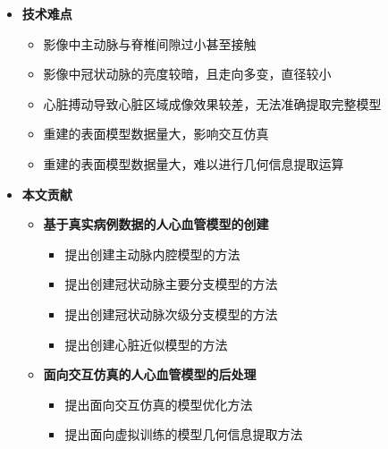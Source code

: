 \begin{frame}
\begin{itemize}
\item \textbf{技术难点}
\begin{itemize}
\item 影像中主动脉与脊椎间隙过小甚至接触
\item 影像中冠状动脉的亮度较暗，且走向多变，直径较小
\item 心脏搏动导致心脏区域成像效果较差，无法准确提取完整模型
\item 重建的表面模型数据量大，影响交互仿真
\item 重建的表面模型数据量大，难以进行几何信息提取运算
\end{itemize}
\end{itemize}
\end{frame}

\begin{frame}
\begin{itemize}
  \item \textbf{本文贡献}
  \begin{itemize}
    \item \textbf{基于真实病例数据的人心血管模型的创建}
    \begin{itemize}
      \item 提出创建主动脉内腔模型的方法
      \item 提出创建冠状动脉主要分支模型的方法
      \item 提出创建冠状动脉次级分支模型的方法
      \item 提出创建心脏近似模型的方法
    \end{itemize}
    \item \textbf{面向交互仿真的人心血管模型的后处理}
    \begin{itemize}
      \item 提出面向交互仿真的模型优化方法
      \item 提出面向虚拟训练的模型几何信息提取方法
    \end{itemize}
  \end{itemize}
\end{itemize}
\end{frame} 